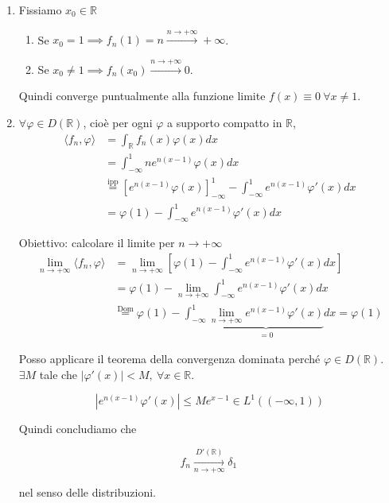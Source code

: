 \begin{enumerate}
\item Fissiamo $x_{0} \in \mathbb{R}$
\begin{enumerate}
\item Se $x_{0} =1\implies f_{n}( 1) =n\xrightarrow{n\rightarrow +\infty } +\infty $.
\item Se $x_{0} \neq 1\implies f_{n}( x_{0})\xrightarrow{n\rightarrow +\infty } 0$.
\end{enumerate}

Quindi converge puntualmente alla funzione limite $f( x) \equiv 0\ \forall x\neq 1$.
\item $\forall \varphi \in D(\mathbb{R})$, cioè per ogni $\varphi $ a supporto compatto in $\mathbb{R}$,\begin{align*}
\langle f_{n} ,\varphi \rangle  & =\int _{\mathbb{R}} f_{n}( x) \varphi ( x) dx\\
 & =\int ^{1}_{-\infty } ne^{n( x-1)} \varphi ( x) dx\\
 & \overset{\text{ipp}}{=}\left[ e^{n( x-1)} \varphi ( x)\right]^{1}_{-\infty } -\int ^{1}_{-\infty } e^{n( x-1)} \varphi '( x) dx\\
 & =\varphi ( 1) -\int ^{1}_{-\infty } e^{n( x-1)} \varphi '( x) dx
\end{align*}

Obiettivo: calcolare il limite per $n\rightarrow +\infty $\begin{align*}
\lim\limits _{n\rightarrow +\infty } \langle f_{n} ,\varphi \rangle  & =\lim\limits _{n\rightarrow +\infty }\left[ \varphi ( 1) -\int ^{1}_{-\infty } e^{n( x-1)} \varphi '( x) dx\right]\\
 & =\varphi ( 1) -\lim\limits _{n\rightarrow +\infty }\int ^{1}_{-\infty } e^{n( x-1)} \varphi '( x) dx\\
 & \overset{\text{Dom}}{=} \varphi ( 1) -\int ^{1}_{-\infty }\underbrace{\lim\limits _{n\rightarrow +\infty } e^{n( x-1)} \varphi '( x)}_{=0} dx=\varphi ( 1)
\end{align*}

Posso applicare il teorema della convergenza dominata perché $\varphi \in D(\mathbb{R})$. $\exists M$ tale che $| \varphi '( x)| < M,\ \forall x\in \mathbb{R}$.

\begin{equation*}
\left| e^{n( x-1)} \varphi '( x)\right| \leqslant Me^{x-1} \in L^{1}(( -\infty ,1))
\end{equation*}

Quindi concludiamo che

\begin{equation*}
f_{n}\xrightarrow[n\rightarrow +\infty ]{D'(\mathbb{R})} \delta _{1} \ 
\end{equation*}

nel senso delle distribuzioni.
\end{enumerate}
